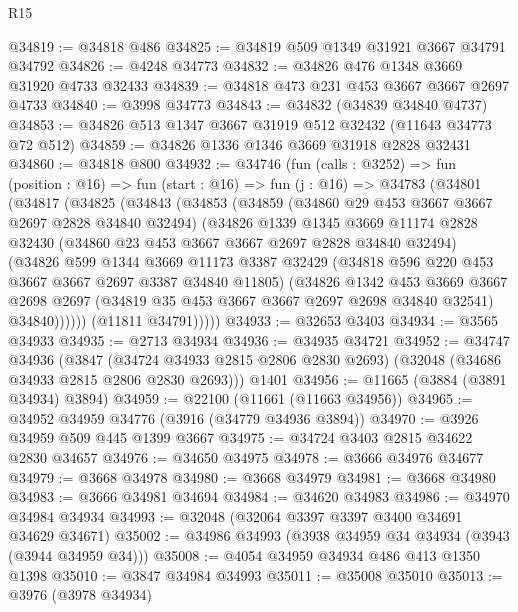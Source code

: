 \begin{lexlean}{R15}
\begin{coremodule}
@34819 := @34818 @486
@34825 := @34819 @509 @1349 @31921 @3667 @34791 @34792
@34826 := @4248 @34773
@34832 := @34826 @476 @1348 @3669 @31920 @4733 @32433
@34839 := @34818 @473 @231 @453 @3667 @3667 @2697 @4733
@34840 := @3998 @34773
@34843 := @34832 (@34839 @34840 @4737)
@34853 := @34826 @513 @1347 @3667 @31919 @512 @32432 (@11643 @34773 @72 @512)
@34859 := @34826 @1336 @1346 @3669 @31918 @2828 @32431
@34860 := @34818 @800
@34932 := @34746
    (fun (calls : @3252) =>
    fun (position : @16) =>
    fun (start : @16) =>
    fun (j : @16) =>
    @34783
      (@34801
        (@34817
          (@34825
            (@34843
              (@34853
                (@34859
                  (@34860 @29 @453 @3667 @3667 @2697 @2828 @34840 @32494)
                  (@34826
                    @1339
                    @1345
                    @3669
                    @11174
                    @2828
                    @32430
                    (@34860 @23 @453 @3667 @3667 @2697 @2828 @34840 @32494)
                    (@34826
                      @599
                      @1344
                      @3669
                      @11173
                      @3387
                      @32429
                      (@34818 @596 @220 @453 @3667 @3667 @2697 @3387 @34840 @11805)
                      (@34826
                        @1342
                        @453
                        @3669
                        @3667
                        @2698
                        @2697
                        (@34819 @35 @453 @3667 @3667 @2697 @2698 @34840 @32541)
                        @34840))))))
            (@11811 @34791)))))
@34933 := @32653 @3403
@34934 := @3565 @34933
@34935 := @2713 @34934
@34936 := @34935 @34721
@34952 := @34747
    @34936
    (@3847 (@34724 @34933 @2815 @2806 @2830 @2693) (@32048 (@34686 @34933 @2815 @2806 @2830 @2693)))
    @1401
@34956 := @11665 (@3884 (@3891 @34934) @3894)
@34959 := @22100 (@11661 (@11663 @34956))
@34965 := @34952 @34959 @34776 (@3916 (@34779 @34936 @3894))
@34970 := @3926 @34959 @509 @445 @1399 @3667
@34975 := @34724 @3403 @2815 @34622 @2830 @34657
@34976 := @34650 @34975
@34978 := @3666 @34976 @34677
@34979 := @3668 @34978
@34980 := @3668 @34979
@34981 := @3668 @34980
@34983 := @3666 @34981 @34694
@34984 := @34620 @34983
@34986 := @34970 @34984 @34934
@34993 := @32048 (@32064 @3397 @3397 @3400 @34691 @34629 @34671)
@35002 := @34986 @34993 (@3938 @34959 @34 @34934 (@3943 (@3944 @34959 @34)))
@35008 := @4054 @34959 @34934 @486 @413 @1350 @1398
@35010 := @3847 @34984 @34993
@35011 := @35008 @35010
@35013 := @3976 (@3978 @34934)

\end{coremodule}
\end{lexlean}
